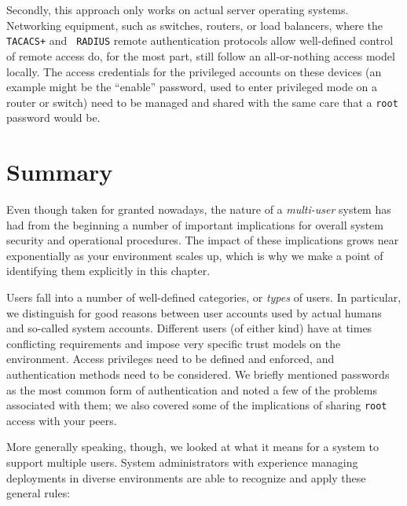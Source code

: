 Secondly, this approach only works on actual server
operating systems.  Networking equipment, such as
switches, routers, or load balancers, where the {\tt
TACACS+} and {\tt
RADIUS} remote authentication
protocols allow well-defined control of remote access
do, for the most part, still follow an all-or-nothing
access model locally.  The access credentials for the
privileged accounts on these devices (an example might
be the ``enable'' password, used to enter privileged
mode on a router or switch) need to be managed and
shared with the same care that a {\tt root} password
would be.

\section{Summary}
\label{multi-user:summary}

Even though taken for granted nowadays, the nature of
a {\em multi-user} system has had from the beginning a
number of important implications for overall system
security and operational procedures.  The impact of
these implications grows near exponentially as your
environment scales up, which is why we make a point of
identifying them explicitly in this chapter.

Users fall into a number of well-defined categories,
or {\em types} of users.  In particular, we
distinguish for good reasons between user accounts
used by actual humans and so-called system accounts.
Different users (of either kind) have at times
conflicting requirements and impose very specific
trust models on the environment.  Access privileges
need to be defined and enforced, and authentication
methods need to be considered.  We briefly mentioned
passwords as the most common form of authentication
and noted a few of the problems associated with them;
we also covered some of the implications of sharing
{\tt root} access with your peers.

More generally speaking, though, we looked at what it
means for a system to support multiple users.  System
administrators with experience managing deployments in
diverse environments are able to recognize and apply
these general rules:

